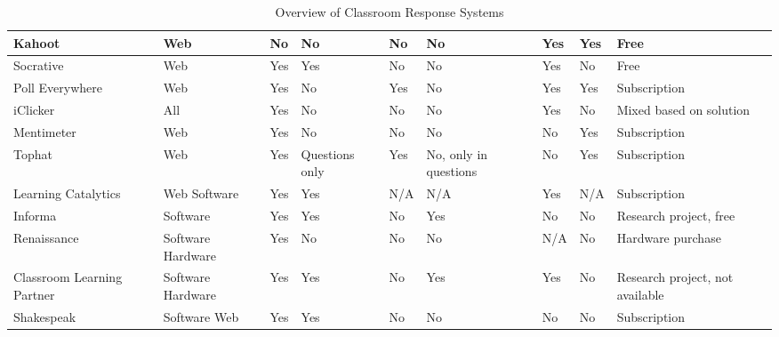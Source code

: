 \begin{landscape}
\begin{center}
\begin{table}[H]
\begin{tabularx}{\paperwidth}{ |X|X|X|X|X|X|X|X|X| }
              Kahoot                & Web   & No    & No    & \cellcolor{red!25}No    & \cellcolor{red!25}No    & Yes   & Yes   & Free \\ \hline
              Socrative             & Web   & Yes   & Yes   & \cellcolor{red!25}No    & \cellcolor{red!25}No    & Yes   & No    & Free \\ \hline
              Poll Everywhere       & Web   & Yes   & No    & \cellcolor{green!25}Yes   & \cellcolor{red!25}No    & Yes   & Yes   & Subscription \\ \hline
              iClicker              & All   & Yes   & No    & \cellcolor{red!25}No    & \cellcolor{red!25}No    & Yes   & No    & Mixed based on solution \\ \hline
              Mentimeter            & Web   & Yes & No   & \cellcolor{red!25}No    & \cellcolor{red!25}No    & No    & Yes   & Subscription \\ \hline
              Tophat                & Web   & Yes & Questions only & \cellcolor{green!25}Yes & \cellcolor{red!25}No, only in questions   & No    & Yes & Subscription \\ \hline
              Learning Catalytics   & Web \newline Software   & Yes    & Yes  & N/A   & N/A   & Yes   & N/A   & Subscription \\ \hline
              Informa        & Software & Yes & Yes  & \cellcolor{red!25}No & \cellcolor{green!25}Yes   & No    & No    & Research project, free \\ \hline
              Renaissance           & Software \newline Hardware & Yes & No & \cellcolor{red!25} No & \cellcolor{red!25}No & N/A & No & Hardware purchase \\ \hline
              Classroom Learning Partner & Software \newline Hardware & Yes & Yes & \cellcolor{red!25}No & \cellcolor{green!25}Yes & Yes & No & Research project, not available \\ \hline
              Shakespeak            & Software \newline Web & Yes & Yes & \cellcolor{red!25}No & \cellcolor{red!25}No & No & No & Subscription \\
              \hline
            \end{tabularx}
            \caption{Overview of Classroom Response Systems}\label{tab:overview}
        \end{table}
    \end{center}
\end{landscape}






